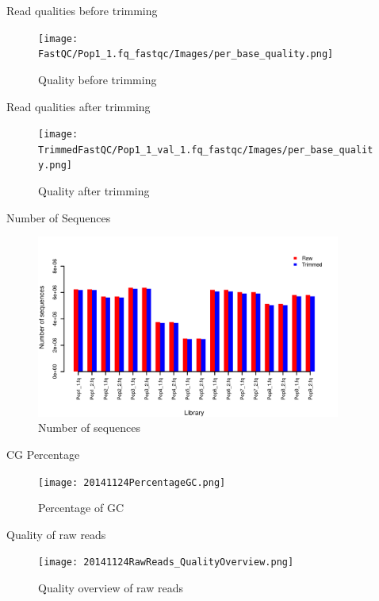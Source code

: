 \documentclass[presentation]{beamer}
\begin{document}
\begin{frame}[label=sec-10]{Read qualities before trimming}
\begin{figure}[htb]
\centering
\texttt{[image: FastQC/Pop1\_1.fq\_fastqc/Images/per\_base\_quality.png]}
\caption{Quality before trimming}
\end{figure}
\end{frame}
\begin{frame}[label=sec-11]{Read qualities after trimming}
\begin{figure}[htb]
\centering
\texttt{[image: TrimmedFastQC/Pop1\_1\_val\_1.fq\_fastqc/Images/per\_base\_quality.png]}
\caption{Quality after trimming}
\end{figure}
\end{frame}




\begin{frame}[label=sec-12]{Number of Sequences}
\begin{figure}[htb]
\centering
\includegraphics[width=10cm]{20141124NumberOfSequences.png}
\caption{Number of sequences}
\end{figure}
\end{frame}

\begin{frame}[label=sec-13]{CG Percentage}
\begin{figure}[htb]
\centering
\texttt{[image: 20141124PercentageGC.png]}
\caption{Percentage of GC}
\end{figure}
\end{frame}

\begin{frame}[label=sec-14]{Quality of raw reads}
\begin{figure}[htb]
\centering
\texttt{[image: 20141124RawReads\_QualityOverview.png]}
\caption{Quality overview of raw reads}
\end{figure}
\end{frame}
\end{document}
